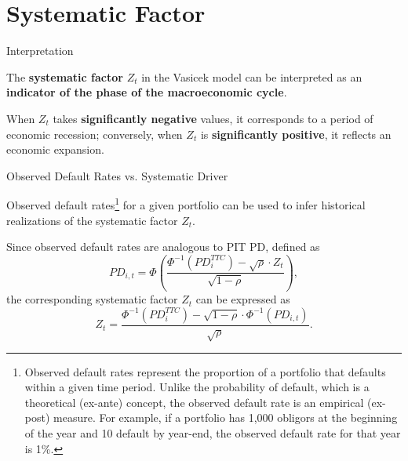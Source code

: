 \documentclass{beamer}
\begin{document}
\section{Systematic Factor}

\begin{frame}{Interpretation}
\justifying
\small

The \textbf{systematic factor} $Z_t$ in the Vasicek model can be interpreted as an \textbf{indicator of the phase of the macroeconomic cycle}.

\medskip

When $Z_t$ takes \textbf{significantly negative} values, it corresponds to a period of economic recession; conversely, when $Z_t$ is \textbf{significantly positive}, it reflects an economic expansion.

\end{frame}


\begin{frame}{Observed Default Rates vs. Systematic Driver}
\justifying
\small

Observed default rates\footnote{\tiny{Observed default rates represent the proportion of a portfolio that defaults within a given time period. Unlike the probability of default, which is a theoretical (ex-ante) concept, the observed default rate is an empirical (ex-post) measure. For example, if a portfolio has 1,000 obligors at the beginning of the year and 10 default by year-end, the observed default rate for that year is 1\%.}} for a given portfolio can be used to infer historical realizations of the systematic factor $Z_t$.

\medskip

Since observed default rates are analogous to PIT PD, defined as
\begin{equation*}
PD_{i,t} = \Phi \left( \frac{\Phi^{-1}(PD_i^{TTC}) - \sqrt{\rho} \cdot Z_t}{\sqrt{1 - \rho}} \right),
\end{equation*}
the corresponding systematic factor $Z_t$ can be expressed as
\begin{equation}
Z_t = \frac{\Phi^{-1}(PD_i^{TTC}) - \sqrt{1 - \rho} \cdot \Phi^{-1}(PD_{i,t})}{\sqrt{\rho}}.
\end{equation}

\end{frame}
\end{document}
